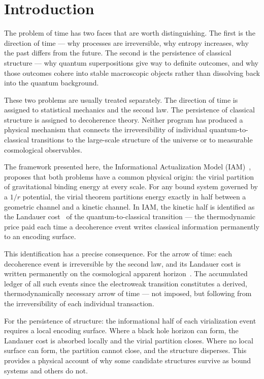 \documentclass[12pt,a4paper]{article}
\begin{document}
\section{Introduction}
\label{sec:intro}

The problem of time has two faces that are worth distinguishing. The first
is the direction of time --- why processes are irreversible, why entropy
increases, why the past differs from the future. The second is the
persistence of classical structure --- why quantum superpositions give way
to definite outcomes, and why those outcomes cohere into stable macroscopic
objects rather than dissolving back into the quantum background.

These two problems are usually treated separately. The direction of time is
assigned to statistical mechanics and the second law. The persistence of
classical structure is assigned to decoherence theory. Neither program has
produced a physical mechanism that connects the irreversibility of individual
quantum-to-classical transitions to the large-scale structure of the universe
or to measurable cosmological observables.

The framework presented here, the Informational Actualization Model
(IAM)~\citep{IAM_theory,IAM_obs}, proposes that both problems have a common
physical origin: the virial partition of gravitational binding energy at
every scale. For any bound system governed by a $1/r$ potential, the virial
theorem partitions energy exactly in half between a geometric channel and a
kinetic channel. In IAM, the kinetic half is identified as the Landauer
cost~\citep{Landauer1961} of the quantum-to-classical transition --- the
thermodynamic price paid each time a decoherence event writes classical
information permanently to an encoding surface.

This identification has a precise consequence. For the arrow of time:
each decoherence event is irreversible by the second law, and its
Landauer cost is written permanently on the cosmological apparent
horizon~\citep{Jacobson1995,CaiKim2005,Gibbons1977}. The accumulated
ledger of all such events since the electroweak transition constitutes
a derived, thermodynamically necessary arrow of time --- not imposed, but
following from the irreversibility of each individual transaction.

For the persistence of structure: the informational half of each
virialization event requires a local encoding surface. Where a black hole
horizon can form, the Landauer cost is absorbed locally and the virial
partition closes. Where no local surface can form, the partition cannot
close, and the structure disperses. This provides a physical account of
why some candidate structures survive as bound systems and others do not.
\end{document}
